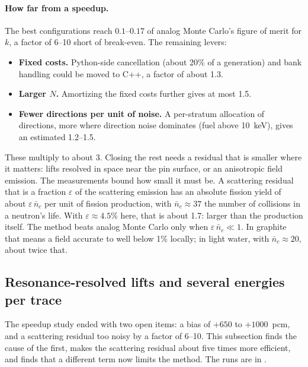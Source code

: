 \paragraph{How far from a speedup.} The best configurations reach $0.1$--$0.17$ of analog Monte Carlo's
figure of merit for $k$, a factor of 6--10 short of break-even. The remaining levers:
\begin{itemize}
\item \textbf{Fixed costs.} Python-side cancellation (about 20\% of a generation) and bank handling
  could be moved to C++, a factor of about 1.3.
\item \textbf{Larger $N$.} Amortizing the fixed costs further gives at most 1.5.
\item \textbf{Fewer directions per unit of noise.} A per-stratum allocation of directions, more where
  direction noise dominates (fuel above 10~keV), gives an estimated 1.2--1.5.
\end{itemize}
These multiply to about 3. Closing the rest needs a residual that is smaller where it matters: lifts
resolved in space near the pin surface, or an anisotropic field emission. The measurements bound how
small it must be. A scattering residual that is a fraction $\varepsilon$ of the scattering emission
has an absolute fission yield of about $\varepsilon\,\bar n_c$ per unit of fission production, with
$\bar n_c\approx37$ the number of collisions in a neutron's life. With $\varepsilon\approx4.5\%$
here, that is about 1.7: larger than the production itself. The method beats analog Monte Carlo only
when $\varepsilon\,\bar n_c\ll1$. In graphite that means a field accurate to well below 1\% locally;
in light water, with $\bar n_c\approx20$, about twice that.

\subsection{Resonance-resolved lifts and several energies per trace}\label{sec:res:lifts}

The speedup study ended with two open items: a bias of $+650$ to $+1000$~pcm, and a scattering
residual too noisy by a factor of 6--10. This subsection finds the cause of the first, makes the
scattering residual about five times more efficient, and finds that a different term now limits
the method. The runs are in .

